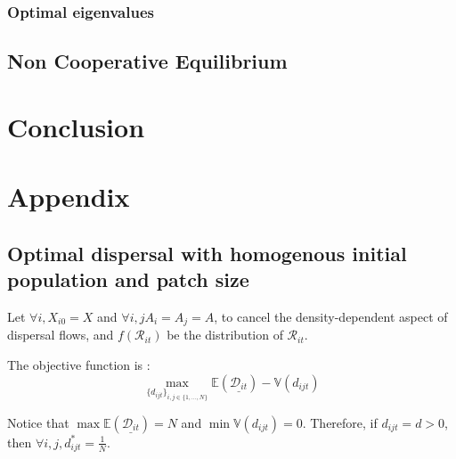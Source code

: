 \documentclass{article}
\begin{document}
\subsubsection{Optimal eigenvalues}

\subsection{Non Cooperative Equilibrium}




\section{Conclusion}

\newpage
\section{Appendix}
\subsection{Optimal dispersal with homogenous initial population and patch size}
Let $\forall i, X_{i0}=X$ and $\forall i,j A_i = A_j = A$, to cancel the density-dependent aspect of dispersal flows, and $f(\mathcal{R}_{it})$ be the distribution of $\mathcal{R}_{it}$. 

The objective function is : 
\begin{equation}
\max_{\{ d_{ijt}\}_{i,j \in \{1,..., N\}}} \mathbb{E}(\underline{\mathcal{D}_{it}})  - \mathbb{V}(d_{ijt})
\end{equation}  

Notice that $ \max \mathbb{E}(\underline{\mathcal{D}_{it}}) = N$ and $\min \mathbb{V}(d_{ijt})=0$. Therefore, if $d_{ijt} = d>0$, then $\forall i,j, d_{ijt}^* = \frac{1}{N}$. 
\end{document}
